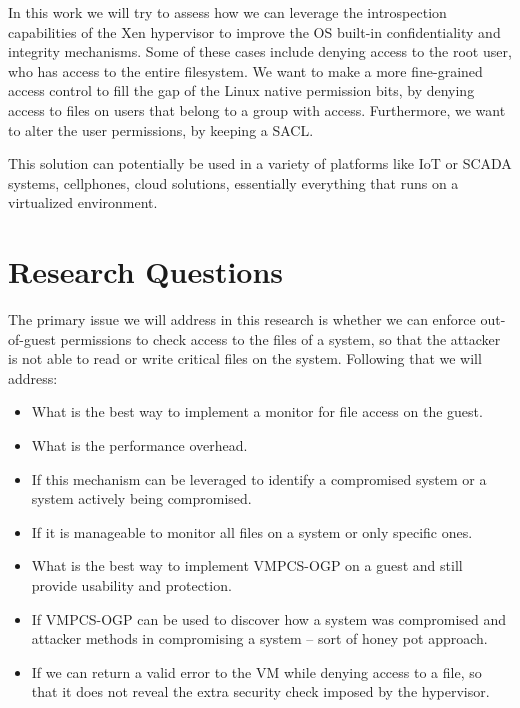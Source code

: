 \par In this work we will try to assess how we can leverage the introspection capabilities of the Xen hypervisor to improve the \ac{OS} built-in confidentiality and integrity mechanisms. Some of these cases include denying access to the root user, who has access to the entire filesystem. We want to make a more fine-grained access control to fill the gap of the Linux native permission bits, by denying access to files on users that belong to a group with access. Furthermore, we want to alter the user permissions, by keeping a \ac{SACL}. 

\par This solution can potentially be used in a variety of platforms like \ac{IoT} or \ac{SCADA} systems, cellphones, cloud solutions, essentially everything that runs on a virtualized environment.

\section{Research Questions}\label{sec:question}
\par The primary issue we will address in this research is whether we can enforce out-of-guest permissions to check access to the files of a system, so that the attacker is not able to read or write critical files on the system. Following that we will address:
\begin{itemize}
	\item What is the best way to implement a monitor for file access on the guest.
	\item What is the performance overhead.
	\item If this mechanism can be leveraged to identify a compromised system or a system actively being compromised.
	\item If it is manageable to monitor all files on a system or only specific ones. 
	\item What is the best way to implement \ac{VMPCS-OGP} on a guest and still provide usability and protection.
	\item If \ac{VMPCS-OGP} can be used to discover how a system was compromised and attacker methods in compromising a system – sort of honey pot approach.
	\item If we can return a valid error to the VM while denying access to a file, so that it does not reveal the extra security check imposed by the hypervisor.
\end{itemize}


